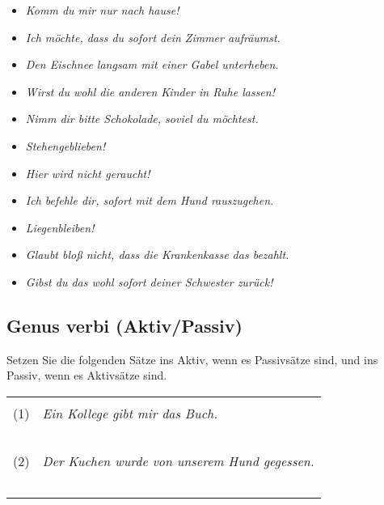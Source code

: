 \documentclass[12pt,a4paper,twoside]{article}
\newcommand{\Lf}{
  \setlength{\itemsep}{1pt}
  \setlength{\parskip}{0pt}
  \setlength{\parsep}{0pt}
}
\begin{document}
\begin{itemize}[label=\Square]\Lf
  \item \textit{Komm du mir nur nach hause!}
  \item \textit{Ich möchte, dass du sofort dein Zimmer aufräumst.}
  \item \textit{Den Eischnee langsam mit einer Gabel unterheben.}
  \item \textit{Wirst du wohl die anderen Kinder in Ruhe lassen!}
  \item \textit{Nimm dir bitte Schokolade, soviel du möchtest.}
  \item \textit{Stehengeblieben!}
  \item \textit{Hier wird nicht geraucht!}
  \item \textit{Ich befehle dir, sofort mit dem Hund rauszugehen.}
  \item \textit{Liegenbleiben!}
  \item \textit{Glaubt bloß nicht, dass die Krankenkasse das bezahlt.}
  \item \textit{Gibst du das wohl sofort deiner Schwester zurück!}
\end{itemize}

\subsection{ Genus verbi (Aktiv\slash Passiv)}

Setzen Sie die folgenden Sätze ins Aktiv, wenn es Passivsätze sind, und ins Passiv, wenn es Aktivsätze sind.

\begin{center}
  \begin{tabular}[h]{cp{}}
    & \\
    (1) & \textit{Ein Kollege gibt mir das Buch.} \\
    & \\
    &\\\cline{2-2}
    & \\
    &\\\cline{2-2}
    & \\
    (2) & \textit{Der Kuchen wurde von unserem Hund gegessen.} \\
    & \\
    &\\\cline{2-2}
    & \\
    &\\\cline{2-2}
    & \\
  \end{tabular}
\end{center}
\end{document}
